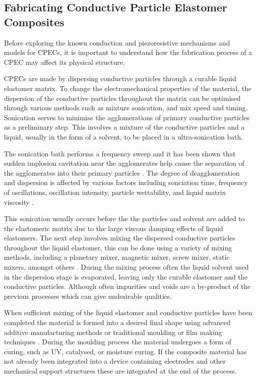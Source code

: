 \subsection{Fabricating Conductive Particle Elastomer Composites}
\label{subsec:Fabricating Conductive Particle Elastomer Composites}
Before exploring the known conduction and piezoresistive mechanisms and models for CPECs, it is important to understand how the fabrication process of a CPEC may affect its physical structure. 

CPECs are made by dispersing conductive particles through a curable liquid elastomer matrix. To change the electromechanical properties of the material, the dispersion of the conductive particles throughout the matrix can be optimised through various methods such as mixture sonication, and mix speed and timing. Sonication serves to minimise the agglomerations of primary conductive particles as a preliminary step. This involves a mixture of the conductive particles and a liquid, usually in the form of a solvent, to be placed in a ultra-sonication bath. 

The sonication bath performs a frequency sweep and it has been shown that sudden implosion cavitation near the agglomerates help cause the separation of the agglomerates into their primary particles \cite{Priyadarshi2021,Kudryashova2019}. The degree of deagglomeration and dispersion is affected by various factors including sonciation time, frequency of oscillations, oscillation intensity, particle wettability, and liquid matrix viscosity \cite{Kudryashova2019,Chen2020a}. 

This sonication usually occurs before the the particles and solvent are added to the elastomeric matrix due to the large viscous damping effects of liquid elastomers. The next step involves mixing the dispersed conductive particles throughout the liquid elastomer, this can be done using a variety of mixing methods, including a planetary mixer, magnetic mixer, screw mixer, static mixers, amongst others \cite{Pegel2008,Rosset2016,Fekiri2020,Kim2012}. During the mixing process often the liquid solvent used in the dispersion stage is evaporated, leaving only the curable elastomer and the conductive particles. Although often impurities and voids are a by-product of the previous processes which can give undesirable qualities.

When sufficient mixing of the liquid elastomer and conductive particles have been completed the material is formed into a desired final shape using advanced additive manufacturing methods \cite{Bastola2018,Sapra2023,Krueger2014,Li2020,McCoul2017,Yi2023,Park2018} or traditional moulding \cite{Kim2018} or film making techniques \cite{Fasolt2017}. During the moulding process the material undergoes a form of curing, such as UV, catalysed, or moisture curing. If the composite material has not already been integrated into a device containing electrodes and other mechanical support structures these are integrated at the end of the process.


